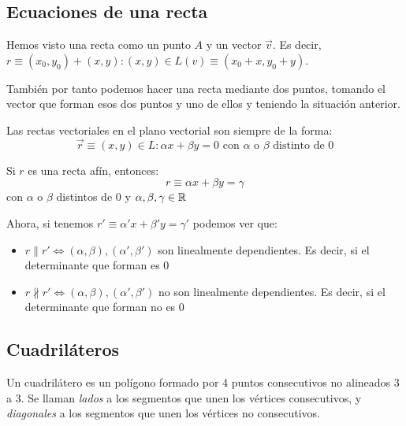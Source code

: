 \subsection{Ecuaciones de una recta}
Hemos visto una recta como un punto $A$ y un vector $\vec{v}$. Es decir, $r \equiv (x_0,y_0) +(x,y) : (x,y) \in L(v) \equiv (x_0+x,y_0+y) $.

También por tanto podemos hacer una recta mediante dos puntos, tomando el vector que forman esos dos puntos y uno de ellos y teniendo la situación anterior.

Las rectas vectoriales en el plano vectorial son siempre de la forma:
\[
  \vec{r} \equiv (x,y) \in L : \alpha x + \beta y = 0 \text{  con $\alpha$ o $\beta$ distinto de 0}
\]

Si $r$ es una recta afín, entonces:
\[
  r \equiv \alpha x + \beta y = \gamma
\] con $\alpha$ o $\beta$ distintos de $0$ y $\alpha,\beta,\gamma \in \mathbb{R}$

Ahora, si tenemos $r'\equiv \alpha' x + \beta' y = \gamma '$ podemos ver que:
\begin{itemize}
\item $r \parallel r' \iff (\alpha,\beta), (\alpha',\beta') $ son linealmente dependientes. Es decir, si el determinante que forman es $0$

\item $r \nparallel r'\iff (\alpha,\beta), (\alpha',\beta') $ no son linealmente dependientes. Es decir, si el determinante que forman no es $0$
\end{itemize}

\subsection{Cuadriláteros}

\begin{ndef}
  Un cuadrilátero es un polígono formado por 4 puntos consecutivos no alineados 3 a 3. Se llaman \textit{lados} a los segmentos que unen los vértices consecutivos, y \textit{diagonales} a los segmentos que unen los vértices no consecutivos.
\end{ndef}

